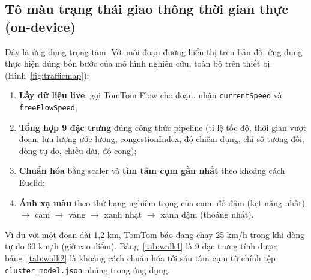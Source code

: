 \subsection{Tô màu trạng thái giao thông thời gian thực (on-device)}
Đây là ứng dụng trọng tâm. Với mỗi đoạn đường hiển thị trên bản đồ, ứng dụng thực hiện đúng bốn bước của mô hình nghiên cứu, toàn bộ trên thiết bị (Hình~\ref{fig:trafficmap}):
\begin{enumerate}[label=\textbf{Bước \arabic*.},leftmargin=2.2cm,itemsep=1pt]
 \item \textbf{Lấy dữ liệu live}: gọi TomTom Flow cho đoạn, nhận \texttt{currentSpeed} và \texttt{freeFlowSpeed};
 \item \textbf{Tổng hợp 9 đặc trưng} đúng công thức pipeline (tỉ lệ tốc độ, thời gian vượt đoạn, lưu lượng ước lượng, congestionIndex, độ chiếm dụng, chỉ số tương đối, dòng tự do, chiều dài, độ cong);
 \item \textbf{Chuẩn hóa} bằng scaler và \textbf{tìm tâm cụm gần nhất} theo khoảng cách Euclid;
 \item \textbf{Ánh xạ màu} theo thứ hạng nghiêm trọng của cụm: đỏ đậm (kẹt nặng nhất) $\rightarrow$ cam $\rightarrow$ vàng $\rightarrow$ xanh nhạt $\rightarrow$ xanh đậm (thoáng nhất).
\end{enumerate}

Ví dụ với một đoạn dài 1{,}2 km, TomTom báo đang chạy 25 km/h trong khi dòng tự do 60 km/h (giờ cao điểm). Bảng~\ref{tab:walk1} là 9 đặc trưng tính được; bảng~\ref{tab:walk2} là khoảng cách chuẩn hóa tới sáu tâm cụm từ chính tệp \texttt{cluster\_model.json} nhúng trong ứng dụng.

